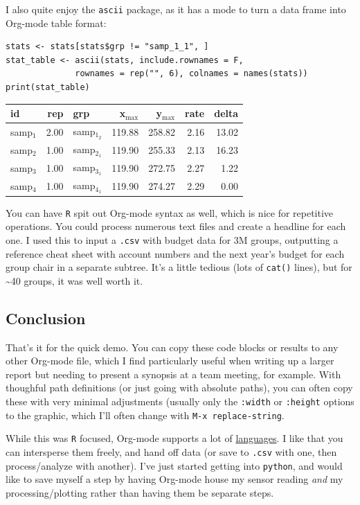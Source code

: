 \documentclass[11pt]{article}
\begin{document}
I also quite enjoy the \texttt{ascii} package, as it has a mode to turn a data frame into
Org-mode table format:

\begin{verbatim}
stats <- stats[stats$grp != "samp_1_1", ]
stat_table <- ascii(stats, include.rownames = F,
              rownames = rep("", 6), colnames = names(stats))
print(stat_table)
\end{verbatim}

\begin{center}
\begin{tabular}{lrlrrrr}
\toprule
id & rep & grp & x\(_{\text{max}}\) & y\(_{\text{max}}\) & rate & delta\\
\midrule
samp\(_{\text{1}}\) & 2.00 & samp\(_{\text{1}}_{\text{2}}\) & 119.88 & 258.82 & 2.16 & 13.02\\
samp\(_{\text{2}}\) & 1.00 & samp\(_{\text{2}}_{\text{1}}\) & 119.90 & 255.33 & 2.13 & 16.23\\
samp\(_{\text{3}}\) & 1.00 & samp\(_{\text{3}}_{\text{1}}\) & 119.90 & 272.75 & 2.27 & 1.22\\
samp\(_{\text{4}}\) & 1.00 & samp\(_{\text{4}}_{\text{1}}\) & 119.90 & 274.27 & 2.29 & 0.00\\
\bottomrule
\end{tabular}
\end{center}

You can have \texttt{R} spit out Org-mode syntax as well, which is nice for repetitive
operations. You could process numerous text files and create a headline for each one. I
used this to input a \texttt{.csv} with budget data for 3M groups, outputting a reference cheat
sheet with account numbers and the next year's budget for each group chair in a separate
subtree. It's a little tedious (lots of \texttt{cat()} lines), but for \textasciitilde{}40 groups, it was well
worth it.

\subsection*{Conclusion}
\label{sec:orgheadline13}

That's it for the quick demo. You can copy these code blocks or results to any other
Org-mode file, which I find particularly useful when writing up a larger report but
needing to present a synopsis at a team meeting, for example. With thoughful path
definitions (or just going with absolute paths), you can often copy these with very
minimal adjustments (usually only the \texttt{:width} or \texttt{:height} options to the graphic, which
I'll often change with \texttt{M-x replace-string}.

While this was \texttt{R} focused, Org-mode supports a lot of \href{http://orgmode.org/worg/org-contrib/babel/languages.html}{languages}. I like that you can
intersperse them freely, and hand off data (or save to \texttt{.csv} with one, then
process/analyze with another). I've just started getting into \texttt{python}, and would like to
save myself a step by having Org-mode house my sensor reading \emph{and} my processing/plotting
rather than having them be separate steps.
\end{document}
